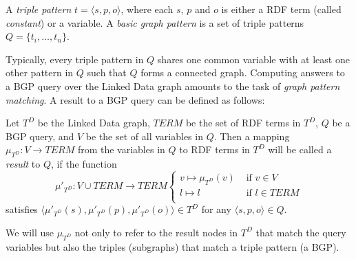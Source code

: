 \begin{definition}
  A \emph{triple pattern} $t=\langle s,p,o \rangle$, where each $s$, $p$ and $o$ is either a RDF term (called \emph{constant}) or a variable. A \emph{basic graph pattern} is a set of triple patterns $Q= \{t_i,\ldots,t_n\}$. 
\end{definition}

Typically, every triple pattern in $Q$ shares one common variable with at least one other pattern in $Q$ such that $Q$ forms a connected graph. Computing answers to a BGP query over the Linked Data graph amounts to the
task of \emph{graph pattern matching}. A result to a BGP query can be defined as
follows:

\begin{definition}[Result]
Let $T^D$ be the Linked Data graph, $TERM$ be the set of RDF terms in $T^D$, $Q$ be a BGP query, and $V$ be the set of all variables in $Q$. Then a mapping
$\mu_{T^D}: V \to TERM$ from the variables in $Q$ to RDF terms
in $T^D$ will be called a \emph{result} to $Q$, if the function
\[
\mu'_{T^D}: V \cup TERM \to TERM \left\{
\begin{array}{ll}
v \mapsto \mu_{T^D}(v) & \mbox{ if } v\in V \\
l \mapsto l & \mbox{ if } l \in TERM\\
\end{array}\right.
\]
satisfies $\langle \mu'_{T^D}(s),\mu'_{T^D}(p), \mu'_{T^D}(o) \rangle \in T^D$ for any $\langle s,p,o \rangle \in Q$. 
\end{definition}

We will use $\mu_{T^D}$ not only to refer to
the result nodes in ${T^D}$ that match the query variables but also the
triples (subgraphs) that match a triple pattern (a BGP).


